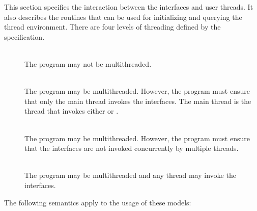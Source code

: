 This section specifies the interaction between the \openshmem interfaces and
user threads.  It also describes the routines that can be used for initializing and
querying the thread environment. There are four levels of threading defined by
the \openshmem specification.

\begin{description}
\item[] \hfill \\
The \openshmem program may not be multithreaded.

\item[] \hfill \\
The \openshmem program may be multithreaded. However, the program must ensure
that only the main thread invokes the \openshmem interfaces. The main thread
is the thread that invokes either  or .

\item[] \hfill \\
The \openshmem program may be multithreaded. However, the program must ensure
that the \openshmem interfaces are not invoked concurrently by multiple threads.

\item[] \hfill \\
The \openshmem program may be multithreaded and any thread may invoke the \openshmem
interfaces.
\end{description}

\noindent The following semantics apply to the usage of these models:

